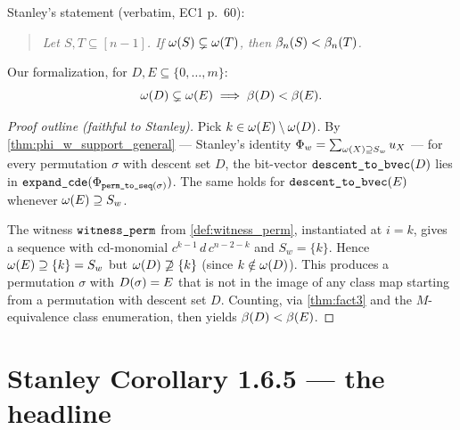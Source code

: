 \begin{proposition}
  \label{prop:omega_proper_beta_lt}
  \rocqok
  Stanley's statement (verbatim, EC1 p.~60):
  \begin{quote}
    \emph{Let $S, T \subseteq [n-1]$.  If $\omega(S) \subsetneq
    \omega(T)$, then $\beta_n(S) < \beta_n(T)$.}
  \end{quote}
  Our formalization, for $D, E \subseteq \{0, \dots, m\}$:
  \[
    \omega(D) \subsetneq \omega(E)
    \;\Longrightarrow\;
    \beta(D) < \beta(E).
  \]

  \begin{proof}[Proof outline (faithful to Stanley)]
    Pick $k \in \omega(E) \setminus \omega(D)$.  By
    \cref{thm:phi_w_support_general} —
    Stanley's identity $\Phi_{w} = \sum_{\omega(X) \supseteq S_w}
    u_{X}$ — for every permutation $\sigma$ with descent set
    $D$, the bit-vector $\texttt{descent\_to\_bvec}(D)$ lies in
    $\texttt{expand\_cde}(\Phi_{\texttt{perm\_to\_seq}(\sigma)})$.  The
    same holds for $\texttt{descent\_to\_bvec}(E)$ whenever
    $\omega(E) \supseteq S_w$.

    The witness $\texttt{witness\_perm}$ from
    \cref{def:witness_perm}, instantiated at $i = k$, gives a sequence
    with cd-monomial $c^{k-1}\,d\,c^{n-2-k}$ and $S_w = \{k\}$.  Hence
    $\omega(E) \supseteq \{k\} = S_w$ but $\omega(D) \not\supseteq
    \{k\}$ (since $k \notin \omega(D)$).  This produces a
    permutation $\sigma$ with $D(\sigma) = E$ that is not in
    the image of any class map starting from a permutation with descent
    set $D$.  Counting, via \cref{thm:fact3} and the $M$-equivalence
    class enumeration, then yields $\beta(D) < \beta(E)$.
  \end{proof}
\end{proposition}

\section{Stanley Corollary 1.6.5 — the headline}

